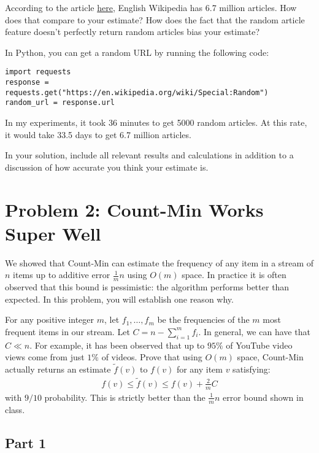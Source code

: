 \documentclass{article}
\begin{document}
According to the article \href{https://en.wikipedia.org/wiki/English_Wikipedia}{here}, English Wikipedia has 6.7 million articles. How does that compare to your estimate? How does the fact that the random article feature doesn't perfectly return random articles bias your estimate?

In Python, you can get a random URL by running the following code:

\begin{verbatim}
import requests
response = requests.get("https://en.wikipedia.org/wiki/Special:Random")
random_url = response.url	
\end{verbatim}

In my experiments, it took 36 minutes to get 5000 random articles. At this rate, it would take 33.5 days to get 6.7 million articles.

In your solution, include all relevant results and calculations in addition to a discussion of how accurate you think your estimate is.

%

\newpage \section*{Problem 2: Count-Min Works Super Well}

We showed that Count-Min can estimate the frequency of any item in a stream of $n$ items up to additive error $\frac{1}{m} n$ using $O(m)$ space. In practice it is often observed that this bound is pessimistic: the algorithm performs better than expected. In this problem, you will establish one reason why. 

For any positive integer $m$, let $f_1, \ldots, f_{m}$ be the frequencies of the $m$ most frequent items in our stream. Let $C = n - \sum_{i=1}^{m} f_i$. In general, we can have that $C \ll n$. For example, it has been observed that up to $95\%$ of YouTube video views come from just $1\%$ of videos. 
Prove that using $O(m)$ space,  Count-Min actually returns an estimate $\tilde{f}(v)$ to $f(v)$ for any item $v$ satisfying:
\begin{align}\label{eq:improved_frequency_bound}
	f(v) \leq \tilde{f}(v) \leq f(v) + \frac{2}{m} C
\end{align}
with $9/10$ probability. This is strictly better than the $\frac{1}{m} n$ error bound shown in class. 

\subsection*{Part 1}
\end{document}
